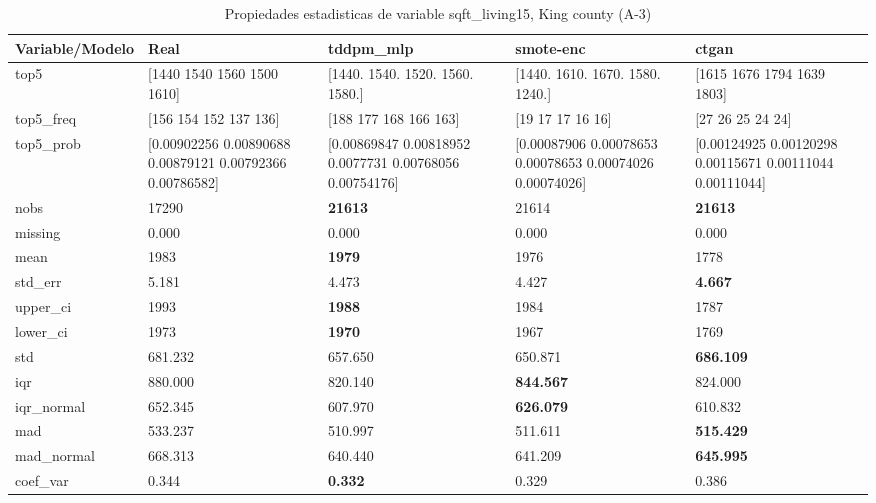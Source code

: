 \begin{table}[H]
\centering
\fontsize{8}{14}\selectfont
\caption{Propiedades  estadisticas de variable sqft\_living15, King county (A-3)}
\label{table-stats-king county-a-3-sqft_living15}
\begin{tabular}{|l|m{10em}|m{10em}|m{10em}|m{10em}|}
\hline
 \rowcolor[gray]{0.8}
Variable/Modelo & Real & tddpm\_mlp & smote-enc & ctgan \\
\hline top5 & [1440 1540 1560 1500 1610] & [1440. 1540. 1520. 1560. 1580.] & [1440. 1610. 1670. 1580. 1240.] & [1615 1676 1794 1639 1803] \\
\hline top5\_freq & [156 154 152 137 136] & [188 177 168 166 163] & [19 17 17 16 16] & [27 26 25 24 24] \\
\hline top5\_prob & [0.00902256 0.00890688 0.00879121 0.00792366 0.00786582] & [0.00869847 0.00818952 0.0077731  0.00768056 0.00754176] & [0.00087906 0.00078653 0.00078653 0.00074026 0.00074026] & [0.00124925 0.00120298 0.00115671 0.00111044 0.00111044] \\
\hline nobs & 17290 & \bfseries 21613 & \cellcolor[rgb]{0.9, 0.54, 0.52} 21614 & \bfseries 21613 \\
\hline missing & 0.000 & 0.000 & 0.000 & 0.000 \\
\hline mean & 1983 & \bfseries 1979 & 1976 & \cellcolor[rgb]{0.9, 0.54, 0.52} 1778 \\
\hline std\_err & 5.181 & 4.473 & \cellcolor[rgb]{0.9, 0.54, 0.52} 4.427 & \bfseries 4.667 \\
\hline upper\_ci & 1993 & \bfseries 1988 & 1984 & \cellcolor[rgb]{0.9, 0.54, 0.52} 1787 \\
\hline lower\_ci & 1973 & \bfseries 1970 & 1967 & \cellcolor[rgb]{0.9, 0.54, 0.52} 1769 \\
\hline std & 681.232 & 657.650 & \cellcolor[rgb]{0.9, 0.54, 0.52} 650.871 & \bfseries 686.109 \\
\hline iqr & 880.000 & \cellcolor[rgb]{0.9, 0.54, 0.52} 820.140 & \bfseries 844.567 & 824.000 \\
\hline iqr\_normal & 652.345 & \cellcolor[rgb]{0.9, 0.54, 0.52} 607.970 & \bfseries 626.079 & 610.832 \\
\hline mad & 533.237 & \cellcolor[rgb]{0.9, 0.54, 0.52} 510.997 & 511.611 & \bfseries 515.429 \\
\hline mad\_normal & 668.313 & \cellcolor[rgb]{0.9, 0.54, 0.52} 640.440 & 641.209 & \bfseries 645.995 \\
\hline coef\_var & 0.344 & \bfseries 0.332 & 0.329 & \cellcolor[rgb]{0.9, 0.54, 0.52} 0.386 \\

\end{tabular}
\end{table}
